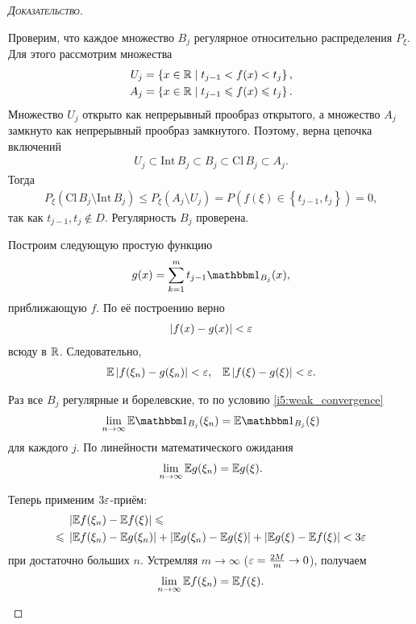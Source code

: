 \documentclass[../main.tex]{subfiles}
\begin{document}
\begin{proof}[\normalfont\textsc{Доказательство}]
\begin{itemize}
   Проверим, что каждое множество $ B_j $ регулярное относительно распределения $ P_\xi $. Для этого рассмотрим множества
   \begin{align*}
    U_j &= \left\{ x \in \mathbb{R} \mid t_{j-1} < f(x) < t_j \right\},\\
    A_j &= \left\{ x \in \mathbb{R} \mid t_{j-1} \leqslant f(x) \leqslant t_j  \right\}.
   \end{align*} Множество $ U_j $ открыто как непрерывный прообраз открытого, а множество $ A_j $ замкнуто как непрерывный прообраз замкнутого. Поэтому, верна цепочка включений
   \begin{align*}
    U_j \subset \mathrm{Int}\,B_j \subset B_j \subset \mathrm{Cl}\,B_j \subset A_j.
   \end{align*} Тогда
   \begin{align*}
    P_\xi(\mathrm{Cl}\,B_j \setminus \mathrm{Int}\,B_j) \leqslant P_\xi(A_j \setminus U_j) = P(f(\xi) \in \left\{ t_{j-1},t_j \right\}) = 0,
   \end{align*} так как $ t_{j-1},t_j \notin D $. Регулярность $ B_j $ проверена.

   Построим следующую простую функцию
   \begin{align*}
    g(x) = \sum_{k=1}^{m} t_{j-1}\Ind_{B_j}(x),
   \end{align*} приближающую $ f $. По её построению верно
   \begin{align*}
    \left| f(x)-g(x) \right| < \varepsilon
   \end{align*} всюду в $ \mathbb{R} $. Следовательно,
   \begin{align*}
    \mathbb E \left| f(\xi_n)-g(\xi_n) \right| < \varepsilon, && \mathbb E \left| f(\xi)-g(\xi) \right| < \varepsilon.
   \end{align*}

   Раз все $ B_j $ регулярные и борелевские, то по условию \ref{i5:weak_convergence}
   \begin{align*}
    \lim_{n \to \infty} \E \Ind_{B_j}(\xi_n) = \E \Ind_{B_j}(\xi)
   \end{align*} для каждого $ j $. По линейности математического ожидания
   \begin{align*}
    \lim_{n \to \infty} \mathbb E g(\xi_n) = \mathbb E g(\xi).
   \end{align*}

   Теперь применим $ 3\varepsilon $-приём:
   \begin{align*}
    &\left| \mathbb E f(\xi_n) - \mathbb E f(\xi) \right| \leqslant \\
    \leqslant\;&\left| \mathbb E f(\xi_n) - \mathbb E g(\xi_n) \right| + \left| \mathbb E g(\xi_n) - \mathbb E g(\xi) \right| + \left| \mathbb E g(\xi) - \mathbb E f(\xi) \right| < 3\varepsilon
   \end{align*} при достаточно больших $ n $. Устремляя $ m \to \infty $  ($ \varepsilon = \frac{2M}{m} \to 0 $), получаем
   \begin{align*}
    \lim_{n \to \infty} \mathbb E f(\xi_n)=\mathbb E f(\xi).
   \end{align*}
 \end{itemize}


\end{proof}
\end{document}
